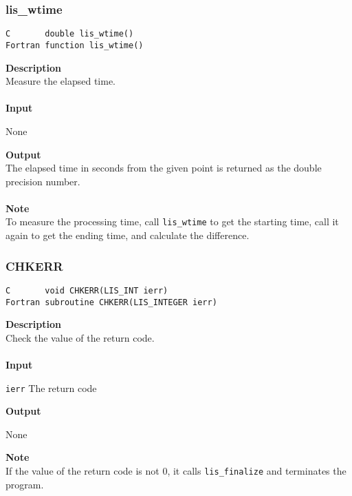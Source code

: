 \documentclass[a4paper]{article}
\newcommand{\namelistlabel}[1]{\mbox{#1}\hfill}
\newenvironment{namelist}[1]{%
\begin{list}{}
  {\let\makelabel\namelistlabel
  \settowidth{\labelwidth}{#1}
  \setlength{\leftmargin}{1.1\labelwidth}}
  }{%
\end{list}}
\begin{document}
\subsubsection{lis\_wtime}
\begin{screen}
\verb|C       double lis_wtime()|\\
\verb|Fortran function lis_wtime()|
\end{screen}
{\bf Description}\\
\indent
Measure the elapsed time. 
\\ \\
\noindent
{\bf Input}
\begin{namelist}{XXXXXXXXXXXXXXXXXXXX}
\item[None]
\end{namelist}
{\bf Output}\\
\indent
The elapsed time in seconds from the given point is returned as the
double precision number.
\\ \\
\noindent
{\bf Note}\\
\indent
To measure the processing time, call \verb|lis_wtime| to get
the starting time, call it again to get the ending time, 
and calculate the difference. 

\subsubsection{CHKERR}
\begin{screen}
\verb|C       void CHKERR(LIS_INT ierr)|\\
\verb|Fortran subroutine CHKERR(LIS_INTEGER ierr)|
\end{screen}
{\bf Description}\\
\indent
Check the value of the return code. 
\\ \\
\noindent
{\bf Input}
\begin{namelist}{XXXXXXXXXXXXXXXXXXXX}
\item[\tt ierr] The return code
\end{namelist}
{\bf Output}
\begin{namelist}{XXXXXXXXXXXXXXXXXXXX}
\item[None] 
\end{namelist}
\noindent
{\bf Note}\\
\indent
If the value of the return code is not 0, it calls \verb|lis_finalize| 
and terminates the program. 

\newpage
\end{document}

